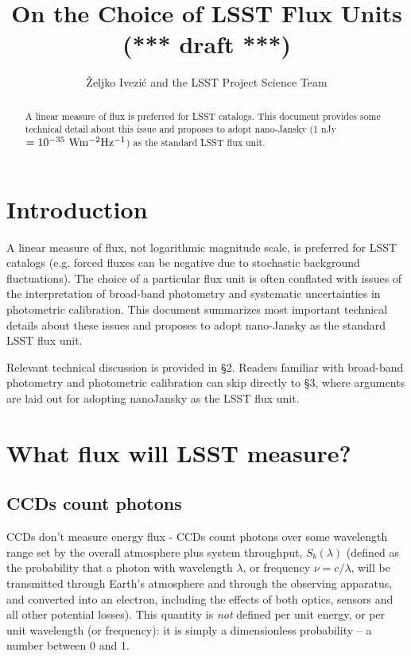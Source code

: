 \documentclass{emulateapj}
\begin{document}
\title{On the Choice of LSST Flux Units (*** draft ***)} 
\author{\v{Z}eljko Ivezi\'{c} and the LSST Project Science Team} 


\begin{abstract}
A linear measure of flux is preferred for LSST catalogs. This document
provides some technical detail about this issue and proposes to adopt
nano-Jansky (1 nJy $=10^{-35} \,\, {\rm W m^{-2} Hz^{-1}}$) as the standard 
LSST flux unit.  
\end{abstract}


\section{Introduction} 

A linear measure of flux, not logarithmic magnitude scale, is preferred
for LSST catalogs (e.g. forced fluxes can be negative due to stochastic
background fluctuations). The choice of a particular flux unit is often
conflated with issues of the interpretation of broad-band photometry 
and systematic uncertainties in photometric calibration. This document
summarizes most important technical details about these issues and 
proposes to adopt nano-Jansky as the standard LSST flux unit. 

Relevant technical discussion is provided in \S 2. Readers familiar 
with broad-band photometry and photometric calibration can skip
directly to \S 3, where  arguments are laid out for adopting nanoJansky 
as the LSST flux unit. 


\section{What flux will LSST measure?} 


\subsection{CCDs count photons} 

CCDs don't measure energy flux - CCDs count photons over some wavelength range set 
by the overall atmosphere plus system throughput,  $S_b(\lambda)$ (defined as the probability 
that a photon with wavelength $\lambda$, or frequency $\nu=c/\lambda$,  will be 
transmitted through Earth's atmosphere and through the observing apparatus, and converted
into an electron, including the effects of both optics, sensors and all other potential losses). 
This quantity is {\it not}  defined per unit energy, or per unit wavelength (or frequency): 
it is simply a dimensionless probability -- a number between 0 and 1. 
\end{document}
